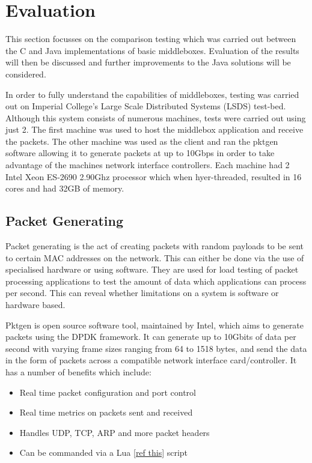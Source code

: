 \documentclass[final_report.tex]{subfiles}
\begin{document}
\section{Evaluation}
\label{sec:evaluation}

This section focusses on the comparison testing which was carried out between the C and Java implementations of basic middleboxes. Evaluation of the results will then be discussed and further improvements to the Java solutions will be considered.

In order to fully understand the capabilities of middleboxes, testing was carried out on Imperial College's Large Scale Distributed Systems (LSDS) test-bed. Although this system consists of numerous machines, tests were carried out using just 2. The first machine was used to host the middlebox application and receive the packets. The other machine was used as the client and ran the pktgen software allowing it to generate packets at up to 10Gbps in order to take advantage of the machines network interface controllers. Each machine had 2 Intel Xeon ES-2690 2.90Ghz processor which when hyer-threaded, resulted in 16 cores and had 32GB of memory.

\subsection{Packet Generating}
Packet generating is the act of creating packets with random payloads to be sent to certain MAC addresses on the network. This can either be done via the use of specialised hardware or using software. They are used for load testing of packet processing applications to test the amount of data which applications can process per second. This can reveal whether limitations on a system is software or hardware based.


Pktgen is open source software tool, maintained by Intel, which aims to generate packets using the DPDK framework. It can generate up to 10Gbits of data per second with varying frame sizes ranging from 64 to 1518 bytes, and send the data in the form of packets across a compatible network interface card/controller. It has a number of benefits which include:

\begin{itemize}
	\item Real time packet configuration and port control
	\item Real time metrics on packets sent and received
	\item Handles UDP, TCP, ARP and more packet headers
	\item Can be commanded via a Lua \ref{ref this} script
\end{itemize}
\end{document}
